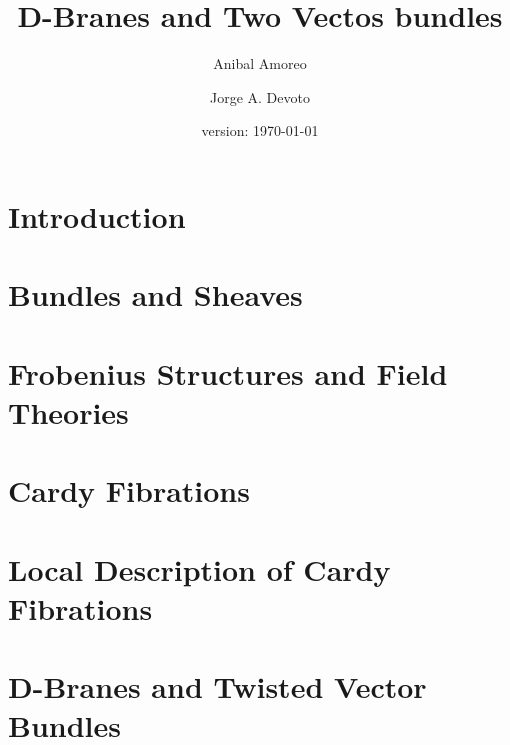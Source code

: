 \documentclass[12pt, a4paper, reqno]{amsbook}
\title{D-Branes and Two Vectos bundles}
\author{Anibal Amoreo \and Jorge A. Devoto}
\date{version: \today}
\theoremstyle{definition}
\begin{document}
\maketitle

\bigskip
\bigskip


\chapter*{Introduction}



\chapter{Bundles and Sheaves}\label{bs}




\chapter{Frobenius Structures and Field Theories}
\label{fsfts}


\chapter{Cardy Fibrations}
\label{cfib}


\chapter{Local Description of Cardy Fibrations}
\label{local_description}


\chapter{D-Branes and Twisted Vector Bundles}
\label{dbtvb}


%

%







\end{document}
